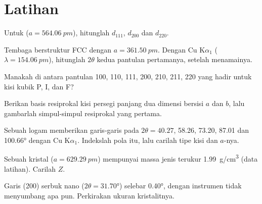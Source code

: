 \section{Latihan}

\begin{exercise}[$\star$]\label{exo:b3:x-ray-diffraction:1}
Untuk  ($a = \qty{564.06}{pm}$), hitunglah $d_{111}$, $d_{200}$ dan $d_{220}$.
\end{exercise}

\begin{exercise}[$\star$]\label{exo:b3:x-ray-diffraction:2}
Tembaga berstruktur FCC dengan $a = \qty{361.50}{pm}$. Dengan Cu K$\alpha_1$
($\lambda = \qty{154.06}{pm}$), hitunglah $2\theta$ kedua pantulan pertamanya,
setelah menamainya.
\end{exercise}

\begin{exercise}[$\star$]\label{exo:b3:x-ray-diffraction:3}
Manakah di antara pantulan 100, 110, 111, 200, 210, 211, 220 yang hadir untuk
kisi kubik P, I, dan F?
\end{exercise}

\begin{exercise}[$\star$]\label{exo:b3:x-ray-diffraction:4}
Berikan basis resiprokal kisi persegi panjang dua dimensi bersisi $a$ dan $b$,
lalu gambarlah simpul-simpul resiprokal yang pertama.
\end{exercise}

\begin{exercise}[$\star\star$]\label{exo:b3:x-ray-diffraction:5}
Sebuah logam memberikan garis-garis pada $2\theta = 40.27$, 58.26, 73.20, 87.01 dan
\ang{100.66} dengan Cu K$\alpha_1$. Indekslah pola itu, lalu carilah tipe kisi
dan $a$-nya.
\end{exercise}

\begin{exercise}[$\star\star$]\label{exo:b3:x-ray-diffraction:6}
Sebuah kristal  ($a = \qty{629.29}{pm}$) mempunyai massa jenis terukur
\qty{1.99}{g/cm^3} (data latihan). Carilah $Z$.
\end{exercise}

\begin{exercise}[$\star\star$]\label{exo:b3:x-ray-diffraction:7}
Garis (200) serbuk nano  ($2\theta = \ang{31.70}$) selebar \ang{0.40},
dengan instrumen tidak menyumbang apa pun. Perkirakan ukuran kristalitnya.
\end{exercise}

